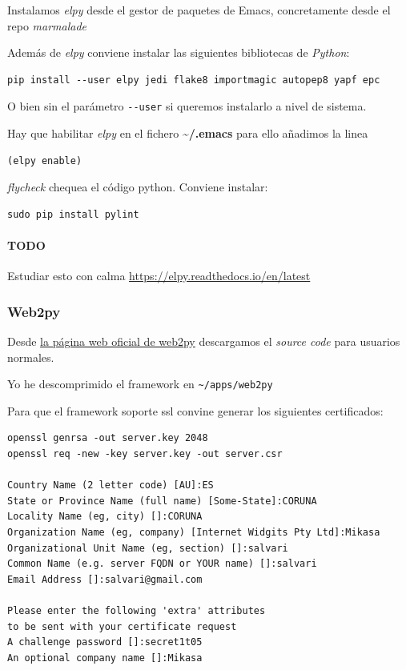 \documentclass[12pt,spanish,]{scrartcl}
\let\oldparagraph\paragraph
\renewcommand{\paragraph}[1]{\oldparagraph{#1}\mbox{}}
\begin{document}
Instalamos \emph{elpy} desde el gestor de paquetes de Emacs,
concretamente desde el repo \emph{marmalade}

Además de \emph{elpy} conviene instalar las siguientes bibliotecas de
\emph{Python}:

\begin{verbatim}
pip install --user elpy jedi flake8 importmagic autopep8 yapf epc
\end{verbatim}

O bien sin el parámetro \texttt{-\/-user} si queremos instalarlo a nivel
de sistema.

Hay que habilitar \emph{elpy} en el fichero
\textbf{\textasciitilde{}/.emacs} para ello añadimos la linea

\begin{verbatim}
(elpy enable)
\end{verbatim}

\emph{flycheck} chequea el código python. Conviene instalar:

\begin{verbatim}
sudo pip install pylint
\end{verbatim}

\hypertarget{todo}{%
\paragraph{TODO}\label{todo}}

Estudiar esto con calma \url{https://elpy.readthedocs.io/en/latest}

\hypertarget{web2py}{%
\subsubsection{Web2py}\label{web2py}}

Desde \href{http://www.web2py.com}{la página web oficial de web2py}
descargamos el \emph{source code} para usuarios normales.

Yo he descomprimido el framework en
\texttt{\textasciitilde{}/apps/web2py}

Para que el framework soporte ssl convine generar los siguientes
certificados:

\begin{verbatim}
openssl genrsa -out server.key 2048
openssl req -new -key server.key -out server.csr

Country Name (2 letter code) [AU]:ES
State or Province Name (full name) [Some-State]:CORUNA
Locality Name (eg, city) []:CORUNA
Organization Name (eg, company) [Internet Widgits Pty Ltd]:Mikasa
Organizational Unit Name (eg, section) []:salvari
Common Name (e.g. server FQDN or YOUR name) []:salvari
Email Address []:salvari@gmail.com

Please enter the following 'extra' attributes
to be sent with your certificate request
A challenge password []:secret1t05
An optional company name []:Mikasa
\end{verbatim}
\end{document}
